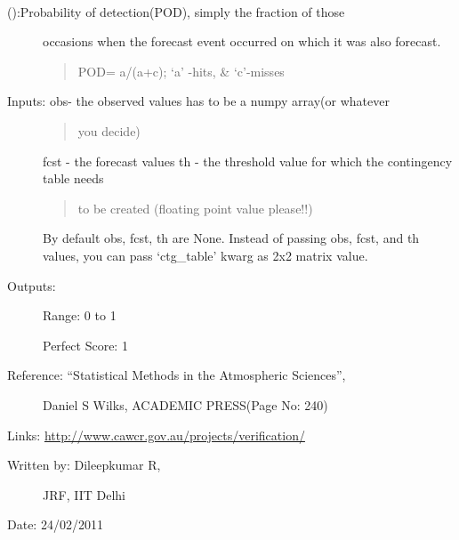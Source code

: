 \documentclass[letterpaper,10pt,english]{sphinxmanual}
\begin{document}

\begin{fulllineitems}
\label{diagnosis:ctgfunction.pod}~\begin{description}
\item[{{\hyperref[diagnosis:ctgfunction.pod]{}} ():Probability of detection(POD), simply the fraction of those}] \leavevmode
occasions when the forecast event occurred on which it was also
forecast.
\begin{quote}

POD= a/(a+c); `a' -hits, \& `c'-misses
\end{quote}

\item[{Inputs: obs- the observed values has to be a numpy array(or whatever}] \leavevmode\begin{quote}

you decide)
\end{quote}

fcst - the forecast values
th  - the threshold value for which the contingency table needs
\begin{quote}

to be created (floating point value please!!)
\end{quote}

By default obs, fcst, th are None. Instead of passing obs, fcst,
and th values, you can pass `ctg\_table' kwarg as 2x2 matrix value.

\item[{Outputs:}] \leavevmode
Range: 0 to 1

Perfect Score: 1

\item[{Reference: ``Statistical Methods in the Atmospheric Sciences'',}] \leavevmode
Daniel S Wilks, ACADEMIC PRESS(Page No: 240)

\end{description}

Links: \href{http://www.cawcr.gov.au/projects/verification/}{http://www.cawcr.gov.au/projects/verification/}
\begin{description}
\item[{Written by: Dileepkumar R,}] \leavevmode
JRF, IIT Delhi

\end{description}

Date: 24/02/2011

\end{fulllineitems}
\end{document}
